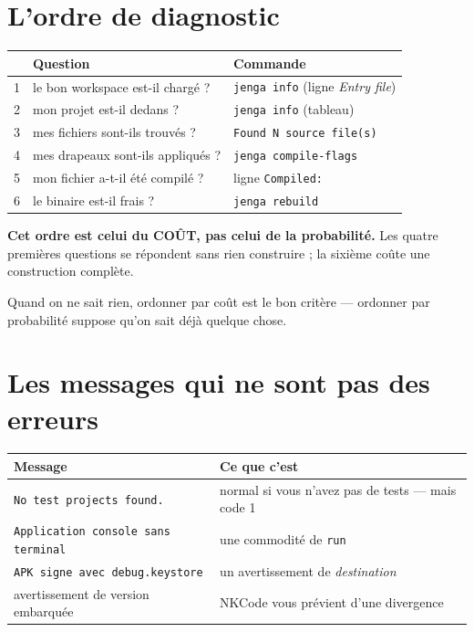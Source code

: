 \section{L'ordre de diagnostic}

\begin{center}
\begin{tabular}{@{}rll@{}}
\toprule
& \textbf{Question} & \textbf{Commande} \\
\midrule
1 & le bon workspace est-il chargé ? & \texttt{jenga info} (ligne \emph{Entry file}) \\
2 & mon projet est-il dedans ? & \texttt{jenga info} (tableau) \\
3 & mes fichiers sont-ils trouvés ? & \texttt{Found N source file(s)} \\
4 & mes drapeaux sont-ils appliqués ? & \texttt{jenga compile-flags} \\
5 & mon fichier a-t-il été compilé ? & ligne \texttt{Compiled:} \\
6 & le binaire est-il frais ? & \texttt{jenga rebuild} \\
\bottomrule
\end{tabular}
\end{center}

\begin{nkretenir}
\textbf{Cet ordre est celui du COÛT, pas celui de la probabilité.} Les quatre
premières questions se répondent sans rien construire ; la sixième coûte une
construction complète.

Quand on ne sait rien, ordonner par coût est le bon critère --- ordonner par
probabilité suppose qu'on sait déjà quelque chose.
\end{nkretenir}

\section{Les messages qui ne sont pas des erreurs}

\begin{center}
\begin{tabular}{@{}ll@{}}
\toprule
\textbf{Message} & \textbf{Ce que c'est} \\
\midrule
\texttt{No test projects found.} & normal si vous n'avez pas de tests --- mais code 1 \\
\texttt{Application console sans terminal} & une commodité de \texttt{run} \\
\texttt{APK signe avec debug.keystore} & un avertissement de \emph{destination} \\
avertissement de version embarquée & NKCode vous prévient d'une divergence \\
\bottomrule
\end{tabular}
\end{center}

